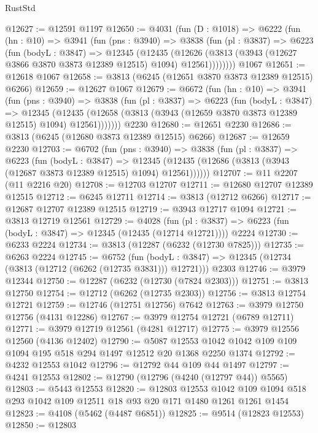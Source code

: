 \begin{lexlean}{RustStd}
\begin{coremodule}
{\begin{coremodule}
{{{{{{{{{{{{{{{{{{{{{{{{{{{{{{{{{{{@12627 := @12591 @1197
@12650 := @4031
    (fun (D : @1018) =>
    @6222
      (fun (hn : @10) =>
      @3941
        (fun (pns : @3940) =>
        @3838
          (fun (pl : @3837) =>
          @6223
            (fun (bodyL : @3847) =>
            @12345
              (@12435
                (@12626 (@3813 (@3943 (@12627 @3866 @3870 @3873 @12389 @12515) @1094) @12561))))))))
    @1067
@12651 := @12618 @1067
@12658 := @3813 (@6245 (@12651 @3870 @3873 @12389 @12515) @6266)
@12659 := @12627 @1067
@12679 := @6672
    (fun (hn : @10) =>
    @3941
      (fun (pns : @3940) =>
      @3838
        (fun (pl : @3837) =>
        @6223
          (fun (bodyL : @3847) =>
          @12345
            (@12435 (@12658 (@3813 (@3943 (@12659 @3870 @3873 @12389 @12515) @1094) @12561)))))))
    @2230
@12680 := @12651 @2230
@12686 := @3813 (@6245 (@12680 @3873 @12389 @12515) @6266)
@12687 := @12659 @2230
@12703 := @6702
    (fun (pns : @3940) =>
    @3838
      (fun (pl : @3837) =>
      @6223
        (fun (bodyL : @3847) =>
        @12345 (@12435 (@12686 (@3813 (@3943 (@12687 @3873 @12389 @12515) @1094) @12561))))))
@12707 := @11 @2207 (@11 @2216 @20)
@12708 := @12703 @12707
@12711 := @12680 @12707 @12389 @12515
@12712 := @6245 @12711
@12714 := @3813 (@12712 @6266)
@12717 := @12687 @12707 @12389 @12515
@12719 := @3943 @12717 @1094
@12721 := @3813 @12719 @12561
@12729 := @4028
    (fun (pl : @3837) => @6223 (fun (bodyL : @3847) => @12345 (@12435 (@12714 @12721))))
    @2224
@12730 := @6233 @2224
@12734 := @3813 (@12287 (@6232 (@12730 @7825)))
@12735 := @6263 @2224
@12745 := @6752
    (fun (bodyL : @3847) => @12345 (@12734 (@3813 (@12712 (@6262 (@12735 @3831))) @12721)))
    @2303
@12746 := @3979 @12344
@12750 := @12287 (@6232 (@12730 (@7824 @2303)))
@12751 := @3813 @12750
@12754 := @12712 (@6262 (@12735 @2303))
@12756 := @3813 @12754 @12721
@12759 := @12746 (@12751 @12756) @7642
@12763 := @3979 @12750 @12756 (@4131 @12286)
@12767 := @3979 @12754 @12721 (@6789 @12711)
@12771 := @3979 @12719 @12561 (@4281 @12717)
@12775 := @3979 @12556 @12560 (@4136 @12402)
@12790 := @5087 @12553 @1042 @1042 @109 @109 @1094 @195 @518 @294 @1497 @12512 @20 @1368 @2250 @1374
@12792 := @4232 @12553 @1042
@12796 := @12792 @44 @109 @44 @1497
@12797 := @4241 @12553
@12802 := @12790 (@12796 (@4240 (@12797 @44)) @5565)
@12803 := @5443 @12553
@12820 := @12803
    @12553
    @1042
    @109
    @1094
    @518
    @293
    @1042
    @109
    @12511
    @18
    @93
    @20
    @171
    @1480
    @1261
    @1261
    @1454
@12823 := @4108 (@5462 (@4487 @6851))
@12825 := @9514 (@12823 @12553)
@12850 := @12803
}}}}}}}}}}}}}}}}}}}}}}}}}}}}}}}}}}}
\end{coremodule}}
\end{coremodule}
\end{lexlean}
